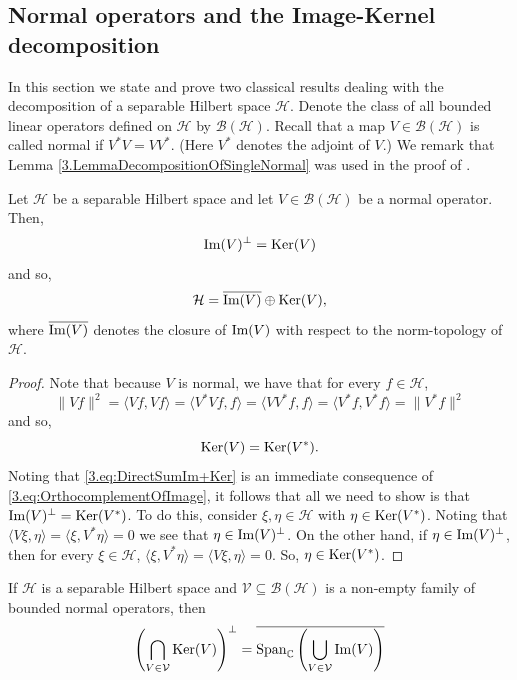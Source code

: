 \documentclass[graybox]{svmult}
\theoremstyle{definition}
\begin{document}
\subsection{Normal operators and the Image-Kernel decomposition}\label{ssec:ImageKernelDecomposition}
In this section we state and prove two classical results dealing with the decomposition of a separable Hilbert space $\mathcal H$. 
Denote the class of all bounded linear operators defined on $\mathcal H$ by $\mathcal B(\mathcal H)$. 
Recall that a map $V\in\mathcal B(\mathcal H)$ is called normal if $V^*V=VV^*$. (Here $V^*$ denotes the adjoint of $V$.) 
We remark that Lemma \ref{3.LemmaDecompositionOfSingleNormal} was used in the proof of  \cite[Theorem 3.1]{AlmostMixingOfAllOrders}.
\begin{lemma}\label{3.LemmaDecompositionOfSingleNormal}
    Let $\mathcal H$ be a separable Hilbert space and let $V\in \mathcal B(\mathcal H)$ be a normal operator. Then, 
    \begin{equation}\label{3.eq:OrthocomplementOfImage}
\text{\rm{Im}}(V)^\perp=\text{\rm{Ker}}(V)
    \end{equation}
and so, 
\begin{equation}\label{3.eq:DirectSumIm+Ker}
\mathcal H=\overline{\text{\rm{Im}}(V)}\oplus\text{\rm{Ker}}(V),
\end{equation}
where $\overline{\text{\rm{Im}}(V)}$ denotes the closure of $\text{\rm{Im}}(V)$ with respect to the norm-topology of $\mathcal H$. 
\end{lemma}
\begin{proof}
Note that because $V$ is normal, we have that for every $f\in\mathcal H$, 
$$
\|Vf\|^2=\langle Vf,Vf \rangle=\langle V^*Vf,f\rangle=\langle VV^*f,f\rangle=\langle V^*f,V^*f\rangle=\|V^*f\|^2  
$$
and so, 
$$
\text{\rm{Ker}}(V)=\text{\rm{Ker}}(V^*).
    $$
Noting that  \eqref{3.eq:DirectSumIm+Ker} is an immediate consequence of \eqref{3.eq:OrthocomplementOfImage}, it follows that all  we need to show is that $\text{\rm{Im}}(V)^\perp=\text{\rm{Ker}}(V^*)$. To do this, consider 
     $\xi,\eta\in\mathcal H$ with $\eta\in \text{\rm{Ker}}(V^*)$. Noting that $\langle V\xi,\eta\rangle=\langle\xi,V^*\eta\rangle=0$ we see that $\eta\in \text{\rm{Im}}(V)^\perp$. On the other hand, if $\eta\in \text{\rm{Im}}(V)^\perp$, then for every $\xi\in\mathcal H$, $\langle \xi,V^*\eta\rangle=\langle V\xi,\eta\rangle=0$. So, $\eta\in \text{\rm{Ker}}(V^*)$.
\end{proof}
\begin{lemma}\label{3.thm:DecompositionOfHilbertSpace2}
    If $\mathcal H$ is a separable Hilbert space and $\mathcal V\subseteq\mathcal B(\mathcal H)$ is a non-empty family of bounded normal operators, then
    $$\left(\bigcap_{V\in\mathcal V}\text{{\rm Ker}}(V)\right)^\perp = \overline{\text{{\rm Span}}_\mathbb C\left(\bigcup_{V\in\mathcal V}\text{{\rm Im}}(V)\right)}$$
\end{lemma}
\end{document}
